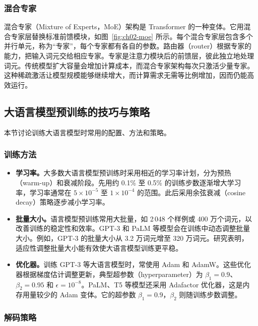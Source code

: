 \subsubsection{混合专家}
混合专家（Mixture of Experts，MoE）架构是 Transformer 的一种变体。它用混合专家层替换标准前馈模块，如图~\ref{fig:ch02-moe} 所示。每个混合专家层包含多个并行单元，称为“专家”，每个专家都有各自的参数。路由器（router）根据专家的能力，把输入词元交给相应专家。专家是注意力模块后的前馈层，彼此独立地处理词元。传统模型扩大容量会增加计算成本，而混合专家架构每次只激活少量专家。这种稀疏激活让模型规模能够继续增大，而计算需求无需等比例增加，因而仍能高效运行。


\subsection{大语言模型预训练的技巧与策略}
本节讨论训练大语言模型时常用的配置、方法和策略。

\subsubsection{训练方法}
\begin{itemize}
\item \textbf{学习率。}大多数大语言模型预训练时采用相近的学习率计划，分为预热（warm-up）和衰减阶段。先用约 0.1\% 至 0.5\% 的训练步数逐渐增大学习率，学习率通常在 $5\times 10^{-5}$ 至 $1\times 10^{-4}$ 的范围。此后采用余弦衰减（cosine decay）策略逐步减小学习率。
\item \textbf{批量大小。}语言模型预训练常用大批量，如 2\,048 个样例或 400 万个词元，以改善训练的稳定性和效率。GPT-3 和 PaLM 等模型会在训练中动态调整批量大小。例如，GPT-3 的批量大小从 3.2 万词元增至 320 万词元。研究表明，适应性调整批量大小能有效使大语言模型训练更平稳。
\item \textbf{优化器。}训练 GPT-3 等大语言模型时，常使用 Adam 和 AdamW。这些优化器根据梯度估计调整更新，典型超参数（hyperparameter）为 $\beta_1=0.9$、$\beta_2=0.95$ 和 $\epsilon=10^{-8}$。PaLM、T5 等模型还采用 Adafactor 优化器，这是内存用量较少的 Adam 变体。它的超参数 $\beta_1=0.9$，$\beta_2$ 则随训练步数调整。
\end{itemize}

\subsubsection{解码策略}
